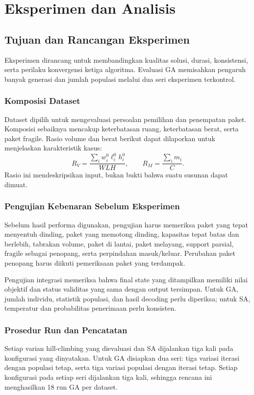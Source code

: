 \section{Eksperimen dan Analisis}
\subsection{Tujuan dan Rancangan Eksperimen}
Eksperimen dirancang untuk membandingkan kualitas solusi, durasi, konsistensi,
serta perilaku konvergensi ketiga algoritma. Evaluasi GA memisahkan pengaruh
banyak generasi dan jumlah populasi melalui dua seri eksperimen terkontrol.

\subsubsection{Komposisi Dataset}
Dataset dipilih untuk mengevaluasi persoalan pemilihan dan penempatan paket.
Komposisi sebaiknya mencakup keterbatasan ruang, keterbatasan berat, serta
paket fragile. Rasio volume dan berat berikut dapat dilaporkan untuk menjelaskan
karakteristik kasus:
\begin{equation}
 R_V=\frac{\sum_i w_i^0\ell_i^0h_i^0}{WLH},\qquad
 R_M=\frac{\sum_i m_i}{C}.
\end{equation}
Rasio ini mendeskripsikan input, bukan bukti bahwa suatu susunan dapat dimuat.


\subsubsection{Pengujian Kebenaran Sebelum Eksperimen}
Sebelum hasil performa digunakan, pengujian harus memeriksa paket yang tepat
menyentuh dinding, paket yang memotong dinding, kapasitas tepat batas dan
berlebih, tabrakan volume, paket di lantai, paket melayang, support parsial,
fragile sebagai penopang, serta perpindahan masuk/keluar. Perubahan paket
penopang harus diikuti pemeriksaan paket yang terdampak.

Pengujian integrasi memeriksa bahwa final state yang ditampilkan memiliki
nilai objektif dan status validitas yang sama dengan output tersimpan.
Untuk GA, jumlah individu, statistik populasi, dan hasil decoding perlu
diperiksa; untuk SA, temperatur dan probabilitas penerimaan perlu konsisten.


\subsubsection{Prosedur Run dan Pencatatan}
Setiap varian hill-climbing yang dievaluasi dan SA dijalankan tiga kali pada
konfigurasi yang dinyatakan. Untuk GA disiapkan dua seri: tiga variasi iterasi
dengan populasi tetap, serta tiga variasi populasi dengan iterasi tetap.
Setiap konfigurasi pada setiap seri dijalankan tiga kali, sehingga rencana
ini menghasilkan 18 run GA per dataset.

